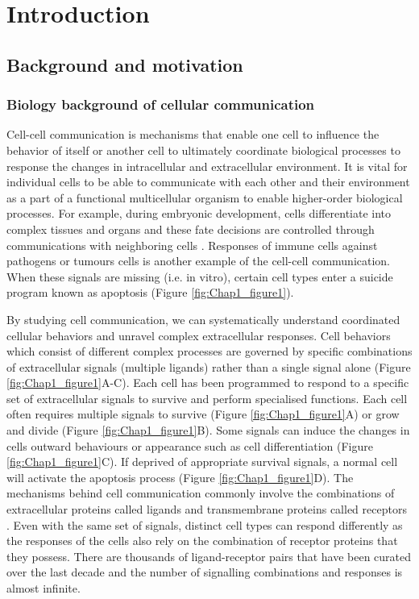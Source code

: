 \chapter[Introduction]{Introduction}
\label{Chap:Intro}


\section{Background and motivation}

\subsection{Biology background of cellular communication}
Cell-cell communication is mechanisms that enable one cell to influence the behavior of itself or another cell to ultimately coordinate biological processes to response the changes in intracellular and extracellular environment. It is vital for individual cells to be able to communicate with each other and their environment as a part of a functional multicellular organism to enable higher-order biological processes. For example, during embryonic development, cells differentiate into complex tissues and organs and these fate decisions are controlled through communications with neighboring cells \cite{gale1996eph, eichmann1997ligand}. Responses of immune cells against pathogens or tumours cells is another example of the cell-cell communication. When these signals are missing (i.e. in vitro), certain cell types enter a suicide program known as apoptosis (Figure \ref{fig:Chap1_figure1}). 

By studying cell communication, we can systematically understand coordinated cellular behaviors and unravel complex extracellular responses. Cell behaviors which consist of different complex processes are governed by specific combinations of extracellular signals (multiple ligands) rather than a single signal alone (Figure \ref{fig:Chap1_figure1}A-C). Each cell has been programmed to respond to a specific set of extracellular signals to survive and perform specialised functions. Each cell often requires multiple signals to survive (Figure \ref{fig:Chap1_figure1}A) or grow and divide (Figure \ref{fig:Chap1_figure1}B). Some signals can induce the changes in cells outward behaviours or appearance such as cell differentiation (Figure \ref{fig:Chap1_figure1}C). If deprived of appropriate survival signals, a normal cell will activate the apoptosis process (Figure \ref{fig:Chap1_figure1}D). The mechanisms behind cell communication commonly involve the combinations of extracellular proteins called ligands and transmembrane proteins called receptors \cite{alberts2018molecular}. Even with the same set of signals, distinct cell types can respond differently as the responses of the cells also rely on the combination of receptor proteins that they possess. There are thousands of ligand-receptor pairs that have been curated over the last decade \cite{salwinski2004database, orchard2012protein} and the number of signalling combinations and responses is almost infinite.


